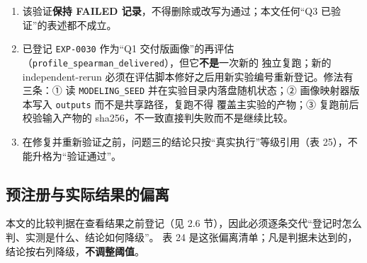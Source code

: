 \documentclass[
  a4paper,12pt]{article}
\providecommand{\tightlist}{%
  \setlength{\itemsep}{0pt}\setlength{\parskip}{0pt}}
\begin{document}
\begin{enumerate}
\def\labelenumi{\arabic{enumi}.}
\tightlist
\item
  该验证\textbf{保持 FAILED 记录}，不得删除或改写为通过；本文任何``Q3
  已验证''的表述都不成立。
\item
  已登记 \texttt{EXP-0030} 作为``Q1
  交付版画像''的再评估（\texttt{profile\_spearman\_delivered}），但它\textbf{不是}一次新的
  独立复跑；新的 independent-rerun
  必须在评估脚本修好之后用新实验编号重新登记。修法有三条：① 读
  \texttt{MODELING\_SEED} 并在实验目录内落盘随机状态；②
  画像映射器版本写入 \texttt{outputs} 而不是共享路径，复跑不得
  覆盖主实验的产物；③ 复跑前后校验输入产物的
  sha256，不一致直接判失败而不是继续比较。
\item
  在修复并重新验证之前，问题三的结论只按``真实执行''等级引用（表
  25），不能升格为``验证通过''。
\end{enumerate}

\subsection{预注册与实际结果的偏离}\label{ux9884ux6ce8ux518cux4e0eux5b9eux9645ux7ed3ux679cux7684ux504fux79bb}

本文的比较判据在查看结果之前登记（见 2.6
节），因此必须逐条交代``登记时怎么判、实测是什么、结论如何降级''。 表 24
是这张偏离清单；凡是判据未达到的，结论按右列降级，\textbf{不调整阈值}。
\end{document}
